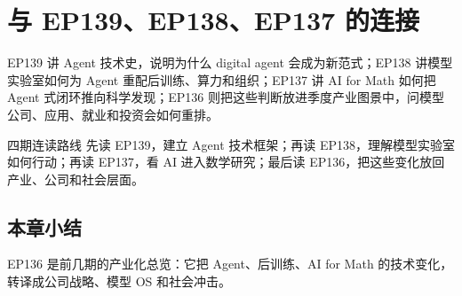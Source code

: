 \section{与 EP139、EP138、EP137 的连接}

EP139 讲 Agent 技术史，说明为什么 digital agent 会成为新范式；EP138 讲模型实验室如何为 Agent 重配后训练、算力和组织；EP137 讲 AI for Math 如何把 Agent 式闭环推向科学发现；EP136 则把这些判断放进季度产业图景中，问模型公司、应用、就业和投资会如何重排。

\begin{knowledgebox}{四期连读路线}
先读 EP139，建立 Agent 技术框架；再读 EP138，理解模型实验室如何行动；再读 EP137，看 AI 进入数学研究；最后读 EP136，把这些变化放回产业、公司和社会层面。
\end{knowledgebox}

\subsection{本章小结}

EP136 是前几期的产业化总览：它把 Agent、后训练、AI for Math 的技术变化，转译成公司战略、模型 OS 和社会冲击。

